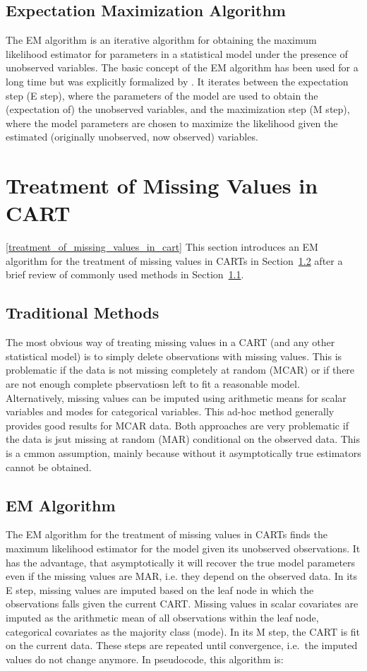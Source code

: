\documentclass[12pt, twoside]{article}
\newcommand{\1}{\mathbb{1}}
\begin{document}
\subsection{Expectation Maximization Algorithm}\label{EM_algorithm}
The EM algorithm is an iterative algorithm for obtaining the maximum likelihood estimator for parameters in a statistical model under the presence of unobserved variables. 
The basic concept of the EM algorithm has been used for a long time but was explicitly formalized by \cite{dempster1977maximum}.
It iterates between the expectation step (E step), where the parameters of the model are used to obtain the (expectation of) the unobserved variables, and the maximization step (M step), where the model parameters are chosen to maximize the likelihood given the estimated (originally unobserved, now observed) variables.

\section{Treatment of Missing Values in CART}\ref{treatment_of_missing_values_in_cart}
This section introduces an EM algorithm for the treatment of missing values in CARTs in Section~\ref{EM_for_CART} after a brief review of commonly used methods in Section~\ref{traditional_methods}.

\subsection{Traditional Methods}\label{traditional_methods}
The most obvious way of treating missing values in a CART (and any other statistical model) is to simply delete observations with missing values. This is problematic if the data is not missing completely at random (MCAR) or if there are not enough complete pbservatiosn left to fit a reasonable model. 
Alternatively, missing values can be imputed using arithmetic means for scalar variables and modes for categorical variables. This ad-hoc method generally provides good results for MCAR data.
Both approaches are very problematic if the data is jsut missing at random (MAR) conditional on the observed data. This is a cmmon assumption, mainly because without it asymptotically true estimators cannot be obtained.

\subsection{EM Algorithm}\label{EM_for_CART}
The EM algorithm for the treatment of missing values in CARTs finds the maximum likelihood estimator for the model given its unobserved observations. It has the advantage, that asymptotically it will recover the true model parameters even if the missing values are MAR, i.e. they depend on the observed data.
In its E step, missing values are imputed based on the leaf node in which the observations falls given the current CART. Missing values in scalar covariates are imputed as the arithmetic mean of all observations within the leaf node, categorical covariates as the majority class (mode).
In its M step, the CART is fit on the current data. 
These steps are repeated until convergence, i.e.\ the imputed values do not change anymore. 
In pseudocode, this algorithm is:
\end{document}
